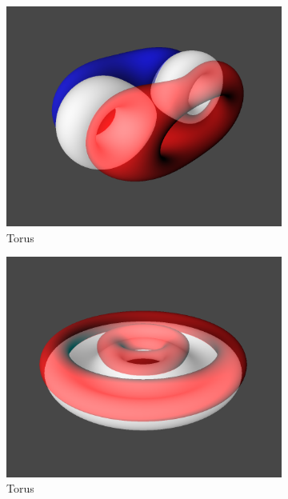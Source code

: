 \documentclass{l4proj}
\begin{document}
\begin{figure}
  \begin{subfigure}[b]{0.24\textwidth}
    \includegraphics[width=\textwidth]{images/representations/onion-torus.png}
    \caption{Torus}
    \label{fig:rep_onion-torus1}
  \end{subfigure}
  \begin{subfigure}[b]{0.24\textwidth}
    \includegraphics[width=\textwidth]{images/representations/onion-torus-2.png}
    \caption{Torus}
    \label{fig:rep_onion-torus2}
  \end{subfigure}
  \begin{subfigure}[b]{0.24\textwidth}

\end{subfigure}
\end{figure}
\end{document}
